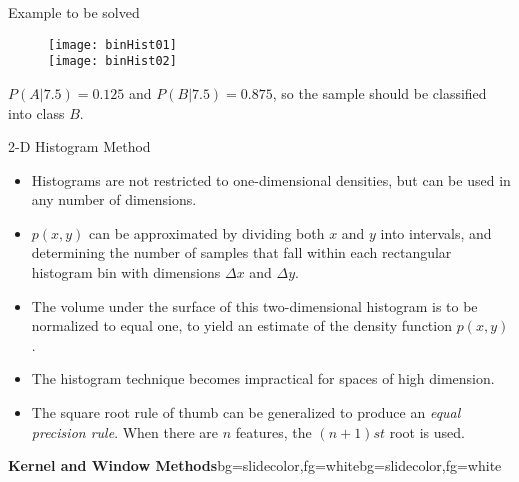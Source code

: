 \begin{frame}{Example to be solved}
\begin{figure}
\texttt{[image: binHist01]}\\
\texttt{[image: binHist02]}
\end{figure}
$P(A|7.5)=0.125$ and $P(B|7.5)=0.875$, so the sample should be classified into class $B$.
\end{frame}

\begin{frame}{2-D Histogram Method}
\begin{itemize}
\item Histograms are not restricted to one-dimensional densities, but can be used in any number of dimensions.
\item $p(x,y)$ can be approximated by dividing both $x$ and $y$ into intervals, and determining the number of samples that fall within each rectangular histogram bin with dimensions $\Delta x$ and $\Delta y$.
\item The volume under the surface of this two-dimensional histogram is to be normalized to equal one, to yield an estimate of the density function $p(x,y)$.
\item The histogram technique becomes impractical for spaces of high dimension.
\item The square root rule of thumb can be generalized to produce an \textit{\color{mycolor1}equal precision rule}. When there are $n$ features, the $(n+1)st$ root is used.
\end{itemize}
\end{frame}

\begin{frame}{}
\begin{variableblock}{\centering \Large \textbf{\vspace{4pt}\newline Kernel and Window Methods\vspace{4pt}}}{bg=slidecolor,fg=white}{bg=slidecolor,fg=white}
\end{variableblock}
\end{frame}


